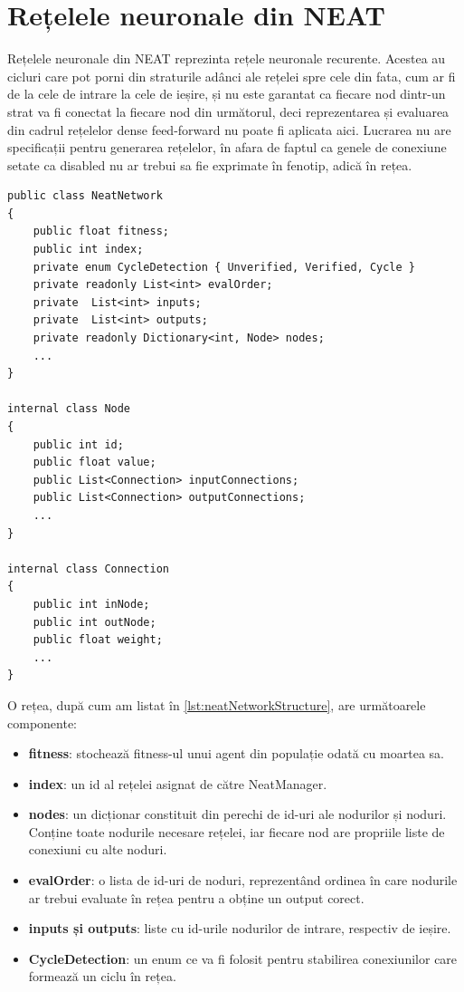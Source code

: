 \section{Rețelele neuronale din NEAT}\label{NeatNetworkCreation}
Rețelele neuronale din NEAT reprezinta rețele neuronale recurente. Acestea au cicluri care pot porni din straturile adânci ale rețelei spre cele din fata, cum ar fi de la cele de intrare la cele de ieșire, și nu este garantat ca fiecare nod dintr-un strat va fi conectat la fiecare nod din următorul, deci reprezentarea și evaluarea din cadrul rețelelor dense feed-forward nu poate fi aplicata aici.
Lucrarea \cite{NEAT} nu are specificații pentru generarea rețelelor, în afara de faptul ca genele de conexiune setate ca disabled nu ar trebui sa fie exprimate în fenotip, adică în rețea.
\begin{lstlisting}[caption={Structura pe clase a unei retele NEAT}, label={lst:neatNetworkStructure}]
public class NeatNetwork
{
    public float fitness;
    public int index;
    private enum CycleDetection { Unverified, Verified, Cycle }
    private readonly List<int> evalOrder;
    private  List<int> inputs;
    private  List<int> outputs;
    private readonly Dictionary<int, Node> nodes;
    ...
}

internal class Node
{
    public int id;
    public float value;
    public List<Connection> inputConnections;
    public List<Connection> outputConnections;
    ...
}

internal class Connection
{
    public int inNode;
    public int outNode;
    public float weight;
    ...
}
\end{lstlisting}
O rețea, după cum am listat în \ref{lst:neatNetworkStructure}, are următoarele componente:
\begin{itemize}
    \item \textbf{fitness}: stochează fitness-ul unui agent din populație odată cu moartea sa.
    \item \textbf{index}: un id al rețelei asignat de către NeatManager.
    \item \textbf{nodes}: un dicționar constituit din perechi de id-uri ale nodurilor și noduri. Conține toate nodurile necesare rețelei, iar fiecare nod are propriile liste de conexiuni cu alte noduri.
    \item \textbf{evalOrder}: o lista de id-uri de noduri, reprezentând ordinea în care nodurile ar trebui evaluate în rețea pentru a obține un output corect.
    \item \textbf{inputs și outputs}: liste cu id-urile nodurilor de intrare, respectiv de ieșire.
    \item \textbf{CycleDetection}: un enum ce va fi folosit pentru stabilirea conexiunilor care formează un ciclu în rețea.
\end{itemize}

